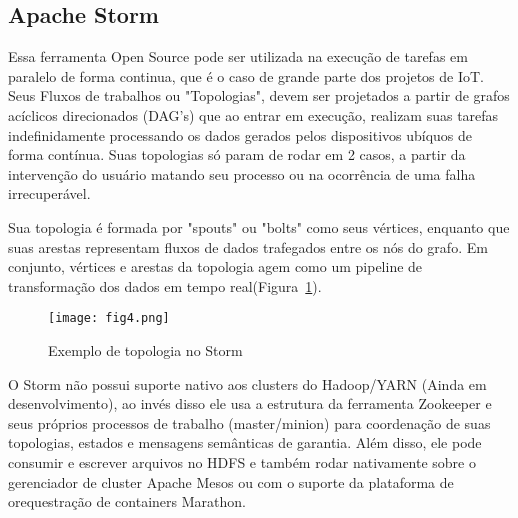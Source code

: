 		\subsection{Apache Storm}
		Essa ferramenta Open Source pode ser utilizada na execu\c{c}\~ao de tarefas em paralelo de forma continua, que \'e o caso de grande parte dos projetos de IoT. Seus Fluxos de trabalhos ou "Topologias", devem ser projetados a partir de grafos ac\'iclicos direcionados (DAG's) que ao entrar em execu\c{c}\~ao, realizam suas tarefas indefinidamente processando os dados gerados pelos dispositivos ub\'iquos de forma cont\'inua. Suas topologias s\'o param de rodar em 2 casos, a partir da interven\c{c}\~ao do usu\'ario matando seu processo ou na ocorr\^encia de uma falha irrecuper\'avel. 
		
		Sua topologia \'e formada por "spouts" ou "bolts" como seus v\'ertices, enquanto que suas arestas representam fluxos de dados trafegados entre os n\'os do grafo. Em conjunto, v\'ertices e arestas da topologia agem como um pipeline de transforma\c{c}\~ao dos dados em tempo real(Figura~\ref{fig:arqstorm}).
		
		\begin{figure}[ht]
			\centering
			\texttt{[image: fig4.png]}
			\caption{Exemplo de topologia no Storm}
			\label{fig:arqstorm}
		\end{figure}
		
		O Storm n\~ao possui suporte nativo aos clusters do Hadoop/YARN (Ainda em desenvolvimento), ao inv\'es disso ele usa a estrutura da ferramenta Zookeeper e seus pr\'oprios processos de trabalho (master/minion) para coordena\c{c}\~ao de suas topologias, estados e mensagens sem\^anticas de garantia. Al\'em disso, ele pode consumir e escrever arquivos no HDFS e tamb\'em rodar nativamente sobre o gerenciador de cluster Apache Mesos ou com o suporte da plataforma de orequestra\c{c}\~ao de containers Marathon.